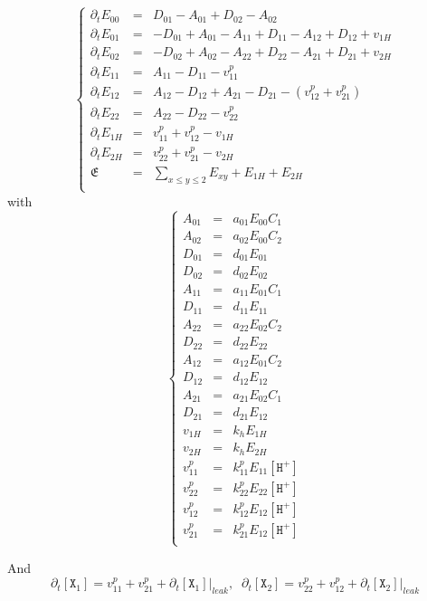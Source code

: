 \documentclass[aps,onecolumn,12pt]{revtex4}
\newcommand{\mychem}[1]{\mathtt{#1}}
\newcommand{\myconc}[1]{\left[#1\right]}
\newcommand{\spx}{\mychem{X}}
\newcommand{\spproton}{\mychem{H^+}}
\newcommand{\proton}{\myconc{\spproton}}
\begin{document}
\begin{equation}
\left\lbrace
\begin{array}{rcl}
\partial_t E_{00} & = & D_{01}-A_{01} + D_{02}-A_{02}\\
\partial_t E_{01} & = & -D_{01}+A_{01} - A_{11} + D_{11} - A_{12} + D_{12} + v_{1H}\\
\partial_t E_{02} & = & -D_{02}+A_{02} - A_{22} + D_{22} - A_{21} + D_{21} + v_{2H}\\
\partial_t E_{11} & = & A_{11}-D_{11} -v^p_{11}\\
\partial_t E_{12} & = & A_{12}-D_{12} + A_{21}-D_{21} - (v^p_{12}+v^p_{21})\\
\partial_t E_{22} & = & A_{22}-D_{22} - v^p_{22}\\
\partial_t E_{1H} & = & v^p_{11}+v^p_{12} - v_{1H}\\
\partial_t E_{2H} & = & v^p_{22}+v^p_{21} - v_{2H}\\
\mathfrak{E}      & = & {\displaystyle \sum_{x\leq y\leq 2} E_{xy}}+E_{1H}+E_{2H}\\
\end{array}
\right.
\end{equation}
with
\begin{equation}
\left\lbrace
\begin{array}{rcl}
A_{01} &= &a_{01} E_{00} C_1\\
A_{02} &= &a_{02} E_{00} C_2\\
D_{01} &= &d_{01} E_{01}\\
D_{02} &= &d_{02} E_{02}\\
A_{11} &= & a_{11} E_{01} C_1 \\
D_{11} &= &d_{11} E_{11}\\
A_{22} &= &a_{22} E_{02} C_2 \\
D_{22} &= &d_{22} E_{22}\\
A_{12} & = & a_{12} E_{01} C_2\\
D_{12} & = & d_{12} E_{12}\\
A_{21} & = & a_{21} E_{02} C_1\\
D_{21} & = & d_{21} E_{12}\\
v_{1H} & = & k_h E_{1H}\\
v_{2H} & = & k_h E_{2H}\\
v^p_{11} & = & k^p_{11} E_{11} \proton \\
v^p_{22} & = & k^p_{22} E_{22} \proton \\
v^p_{12} & = & k^p_{12} E_{12} \proton \\
v^p_{21} & = & k^p_{21} E_{12} \proton \\
\end{array}
\right.
\end{equation}

And
\begin{equation}
	\partial_t \myconc{\spx_1} = v^p_{11}+v^p_{21} + \partial_t \myconc{\spx_1}\vert_{leak},\;\;
	\partial_t \myconc{\spx_2} = v^p_{22}+v^p_{12} + \partial_t \myconc{\spx_2}\vert_{leak}
\end{equation}
\end{document}

